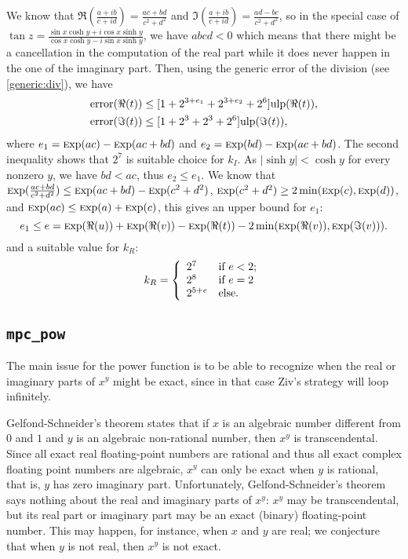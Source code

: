 \documentclass {article}
\newcommand {\Ulp}{{\rm ulp}}
\DeclareMathOperator{\error}{error}
\DeclareMathOperator{\Exp}{{\rm \textsc exp}}
\begin{document}
We know that $\Re(\frac{a+i b}{c+i d})=\frac{a c +b d}{c^2 + d^2}$ and
$\Im(\frac{a+i b}{c+i d})=\frac{a d -b c}{c^2 + d^2}$, so in the special case
of $\tan z=\frac{\sin x\cosh y+i\cos x\sinh y}{\cos x\cosh y-i\sin x\sinh y}$,
we have $abcd < 0$ which means that there might be a cancellation in the
computation of the real part while it does never happen in the one of the
imaginary part.  Then, using the generic error of the division (see
\ref{generic:div}), we have
\begin{align*}
\error(\Re(t)) &\leq [1+2^{3+e_1}+2^{3+e_2}+2^6] \Ulp(\Re(t)),
\\
\error(\Im(t)) &\leq [1+2^3+2^3+2^6] \Ulp(\Im(t)),
\end{align*}
where $e_1=\Exp(a c) -\Exp(a c+b d)$ and $e_2=\Exp(b d) -\Exp(a c+b d)$.  The
second inequality shows that $2^7$ is suitable choice for $k_I$. As $|\sinh
y|<\cosh y$ for every nonzero $y$, we have $bd<ac$, thus $e_2\leq e_1$. We
know that $\Exp(\frac{a c+b d}{c^2+d^2})\leq \Exp(a c+b d) -\Exp(c^2+d^2)$,
$\Exp(c^2+d^2)\geq2 \min(\Exp(c), \Exp(d))$, and $\Exp(ac) \leq \Exp(a) +
\Exp(c)$, this gives an upper bound for $e_1$:
\[
e_1 \leq e = \Exp(\Re(u)) +\Exp(\Re(v)) -\Exp(\Re(t))
-2 \min(\Exp(\Re(v)), \Exp(\Im(v))).
\]
and a suitable value for $k_R$:
\begin{equation*}
k_R=\left\{
\begin{array}{l l}
  2^7 & \mbox{if $e < 2$;}
  \\
  2^8 & \mbox{if $e = 2$}
  \\
  2^{5 + e} & \mbox{else.}
\end{array}
\right.
\end{equation*}

\subsection {\texttt {mpc\_pow}}

The main issue for the power function is to be able to recognize when the
real or imaginary parts of $x^y$ might be exact, since in that case
Ziv's strategy will loop infinitely.

Gelfond-Schneider's theorem states that if $x$ is an algebraic number
different from $0$ and $1$ and $y$ is an algebraic non-rational number,
then $x^y$ is transcendental.
Since all exact real floating-point numbers are rational and thus all exact
complex floating point numbers are algebraic, $x^y$ can only be exact
when $y$ is rational, that is, $y$ has zero imaginary part.
Unfortunately, Gelfond-Schneider's theorem says nothing about the real and
imaginary parts of $x^y$: $x^y$ may be transcendental, but its real part
or imaginary part may be an exact (binary) floating-point number. This
may happen, for instance, when $x$ and $y$ are real; we conjecture that
when $y$ is not real, then $x^y$ is not exact.
\end{document}
